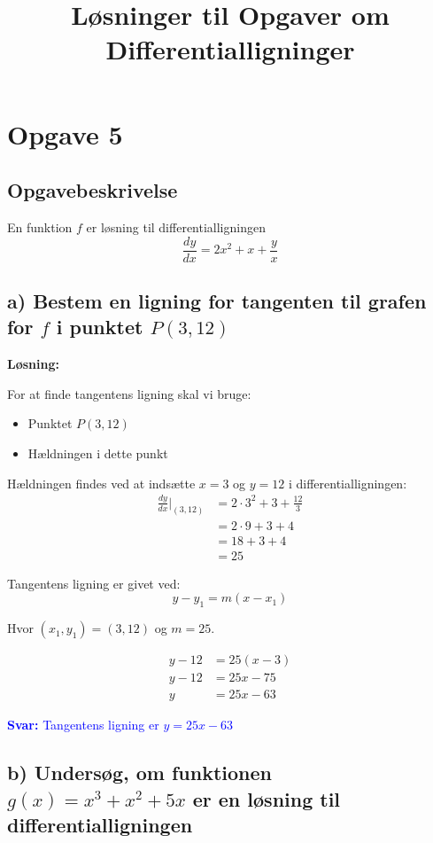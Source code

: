 \documentclass[a4paper,12pt]{article}
\title{\textbf{Løsninger til Opgaver om Differentialligninger}}
\author{}
\date{}
\begin{document}
\maketitle

\section*{Opgave 5}

\subsection*{Opgavebeskrivelse}
En funktion $f$ er løsning til differentialligningen
\[
\frac{dy}{dx} = 2x^2 + x + \frac{y}{x}
\]

\subsection*{a) Bestem en ligning for tangenten til grafen for $f$ i punktet $P(3,12)$}

\textbf{Løsning:}

For at finde tangentens ligning skal vi bruge:
\begin{itemize}
    \item Punktet $P(3,12)$
    \item Hældningen i dette punkt
\end{itemize}

Hældningen findes ved at indsætte $x = 3$ og $y = 12$ i differentialligningen:
\begin{align*}
\frac{dy}{dx}\bigg|_{(3,12)} &= 2 \cdot 3^2 + 3 + \frac{12}{3} \\
&= 2 \cdot 9 + 3 + 4 \\
&= 18 + 3 + 4 \\
&= 25
\end{align*}

Tangentens ligning er givet ved:
\[
y - y_1 = m(x - x_1)
\]

Hvor $(x_1, y_1) = (3, 12)$ og $m = 25$.

\begin{align*}
y - 12 &= 25(x - 3) \\
y - 12 &= 25x - 75 \\
y &= 25x - 63
\end{align*}

\textcolor{blue}{\textbf{Svar:} Tangentens ligning er $y = 25x - 63$}

\subsection*{b) Undersøg, om funktionen $g(x) = x^3 + x^2 + 5x$ er en løsning til differentialligningen}
\end{document}
